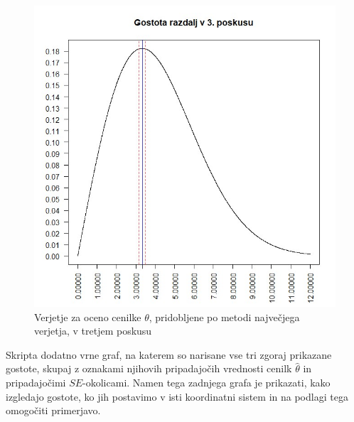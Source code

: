 \documentclass[a4paper, 10pt]{article}
\begin{document}
	\begin{figure}[h!]
		\label{fig: 2Dplot3}
		\centering
		\includegraphics[scale = 0.375]{VerjetjeMNV3}
		\caption{Verjetje za oceno cenilke $\theta$, pridobljene po metodi največjega verjetja, v tretjem poskusu}
	\end{figure}

	Skripta dodatno vrne graf, na katerem so narisane vse tri zgoraj prikazane gostote, skupaj z oznakami njihovih pripadajočih vrednosti cenilk $\widehat{\theta}$ in pripadajočimi $SE$-okolicami. Namen tega zadnjega grafa je prikazati, kako izgledajo gostote, ko jih postavimo v isti koordinatni sistem in na podlagi tega omogočiti primerjavo.
	
\end{document}
